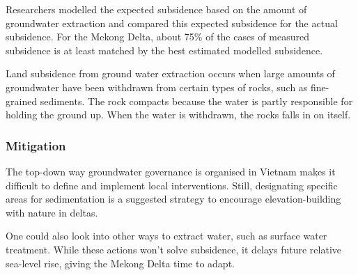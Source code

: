 Researchers modelled the expected subsidence based on the amount of groundwater extraction and compared this expected subsidence for the actual subsidence. For the Mekong Delta, about 75\% of the cases of measured subsidence is at least matched by the best estimated modelled subsidence. \cite{minderhoud2017}

Land subsidence from ground water extraction occurs when large amounts of groundwater have been withdrawn from certain types of rocks, such as fine-grained sediments. The rock compacts because the water is partly responsible for holding the ground up. When the water is withdrawn, the rocks falls in on itself.

\subsubsection{Mitigation}
The top-down way groundwater governance is organised in Vietnam makes it difficult to define and implement local interventions. Still, designating specific areas for sedimentation is a suggested strategy to encourage elevation-building with nature in deltas. \cite{minderhoud2020}

One could also look into other ways to extract water, such as surface water treatment. While these actions won't solve subsidence, it delays future relative sea-level rise, giving the Mekong Delta time to adapt.